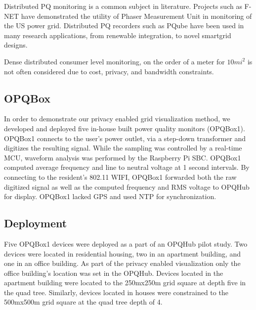 Distributed PQ monitoring is a common subject in literature\cite{daponte2004transientmeter}\cite{byman2000using}\cite{cristaldi2002distributed}. Projects such as F-NET\cite{zhang2010wide} have demonstrated the utility of Phaser Measurement Unit in monitoring of the US power grid. Distributed PQ recorders such as PQube\cite{von2014micro} have been used in many research applications, from renewable integration, to novel smartgrid designs.

Dense distributed consumer level monitoring, on the order of a meter for $10mi^2$ is not often considered due to cost, privacy, and bandwidth constraints. 

\subsection{OPQBox}

In order to demonstrate our privacy enabled grid visualization method, we developed and deployed five in-house built power quality monitors (OPQBox1). OPQBox1 connects to the user's power outlet, via a step-down transformer and digitizes the resulting signal. While the sampling was controlled by a real-time MCU, waveform analysis was performed by the Raspberry Pi SBC. OPQBox1 computed average frequency and line to neutral voltage at 1 second intervals. By connecting to the resident's 802.11 WIFI, OPQBox1 forwarded both the raw digitized signal as well as the computed frequency and RMS voltage to OPQHub for display. OPQBox1 lacked GPS and used NTP for synchronization. 

\subsection{Deployment}

Five OPQBox1 devices were deployed as a part of an OPQHub pilot study. Two devices were located in residential housing,  two in an apartment building, and one in an office building. As part of the privacy enabled visualization only the office building's location was set in the OPQHub. Devices located in the apartment building were located to the 250mx250m grid square at depth five in the quad tree. Similarly, devices located in houses were constrained to the 500mx500m grid square at the quad tree depth of 4. 

